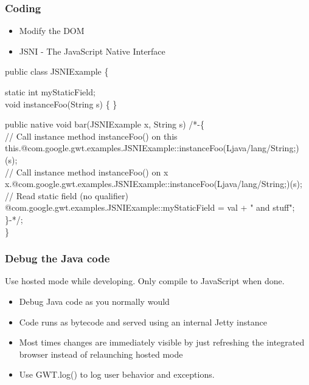 \begin{frame}[red] %
\frametitle{Coding}
\begin{itemize}
\item Modify the DOM
\item JSNI - The JavaScript Native Interface
\end{itemize}
\scriptsize{
public class JSNIExample \{

\hspace{0.5em}  static int myStaticField;\\
\vspace{0.7em}
  void instanceFoo(String s) \{ \}\\
\vspace{0.7em}

  public native void bar(JSNIExample x, String s) /*-\{\\
\vspace{0.7em}\hspace{0.5em}   // Call instance method instanceFoo() on this\\
\hspace{0.5em}    this.@com.google.gwt.examples.JSNIExample::instanceFoo(Ljava/lang/String;)(s);\\

\vspace{0.7em}\hspace{0.5em}    // Call instance method instanceFoo() on x\\
\hspace{0.5em}    x.@com.google.gwt.examples.JSNIExample::instanceFoo(Ljava/lang/String;)(s);\\

\vspace{0.7em}\hspace{0.5em}    // Read static field (no qualifier)\\
\hspace{0.5em}    @com.google.gwt.examples.JSNIExample::myStaticField = val + " and stuff";\\
\hspace{0.5em}   \}-*/;\\
\}
}


\end{frame}


\begin{frame}[red] %
\frametitle{Debug the Java code}
Use hosted mode while developing. Only compile to JavaScript
when done.

\begin{itemize}
\item Debug Java code as you normally would

\item Code runs as bytecode and served using an internal Jetty instance

\item Most times changes are immediately visible by just refreshing the integrated browser instead of relaunching hosted mode

\item Use GWT.log() to log user behavior and exceptions.
\end{itemize}
\end{frame}

